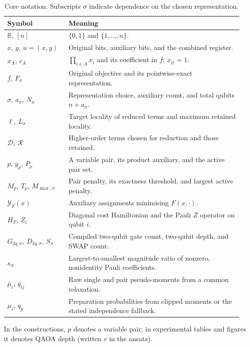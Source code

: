 \documentclass[a4paper,onecolumn,11pt,unpublished]{quantumarticle}
\theoremstyle{remark}
\begin{document}
\begin{table}[htbp]
\centering
\caption{Core notation. Subscripts $\sigma$ indicate dependence on the chosen representation.}
\label{tab:notation}
\small
\renewcommand{\arraystretch}{1.08}
\begin{tabular}{@{}p{0.25\linewidth}p{0.71\linewidth}@{}}
\toprule
Symbol & Meaning \\
\midrule
$\mathbb B$, $[n]$ & $\{0,1\}$ and $\{1,\ldots,n\}$. \\
$x$, $y$, $u=(x,y)$ & Original bits, auxiliary bits, and the combined register. \\
$x_A$, $c_A$ & $\prod_{i\in A}x_i$ and its coefficient in $f$; $x_\varnothing=1$. \\
$f$, $F_\sigma$ & Original objective and its pointwise-exact representation. \\
$\sigma$, $a_\sigma$, $N_\sigma$ & Representation choice, auxiliary count, and total qubits $n+a_\sigma$. \\
$\ell$, $L_\sigma$ & Target locality of reduced terms and maximum retained locality. \\
$\mathcal D$, $\mathcal R$ & Higher-order terms chosen for reduction and those retained. \\
$p$, $y_p$, $P_\rho$ & A variable pair, its product auxiliary, and the active pair set. \\
$M_p$, $T_p$, $M_{\max,\sigma}$ & Pair penalty, its exactness threshold, and largest active penalty. \\
$\mathcal Y_F(x)$ & Auxiliary assignments minimising $F(x,\cdot)$. \\
$H_F$, $Z_i$ & Diagonal cost Hamiltonian and the Pauli $Z$ operator on qubit $i$. \\
$G_{2q,\sigma}$, $D_{2q,\sigma}$, $S_\sigma$ & Compiled two-qubit gate count, two-qubit depth, and SWAP count. \\
$\kappa_\sigma$ & Largest-to-smallest magnitude ratio of nonzero, nonidentity Pauli coefficients. \\
$\bar\mu_i$, $\bar q_{ij}$ & Raw single and pair pseudo-moments from a common relaxation. \\
$\mu_i$, $q_p$ & Preparation probabilities from clipped moments or the stated independence fallback. \\
\bottomrule
\end{tabular}
\par\smallskip
\begin{minipage}{\linewidth}\footnotesize
In the constructions, $p$ denotes a variable pair; in experimental tables
and figures it denotes QAOA depth (written $r$ in the ansatz).
\end{minipage}
\end{table}
\end{document}

